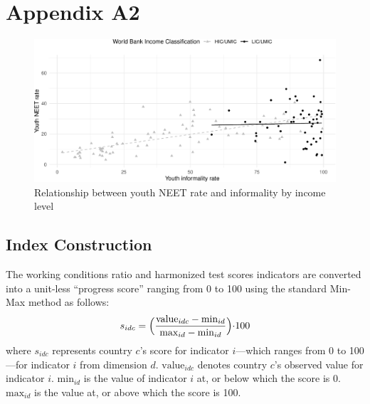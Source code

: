 \documentclass[
  a4paper, twoside, 12pt]{book}
\begin{document}
\newpage
{}
\printbibliography[segment=\therefsegment,heading=subbibintoc,title={References}]

\newpage

\hypertarget{appendix-a}{%
\section*{Appendix A2}\label{appendix-a}}


\setcounter{figure}{0}
\renewcommand{\thefigure}{A2.\arabic{figure}}
\setcounter{table}{0}
\renewcommand{\thetable}{A2.\arabic{table}}

\begin{figure}[H]
\includegraphics{figures/fig-infneet-1} \caption{Relationship between youth NEET rate and informality by income level}\label{fig:fig-infneet}
\end{figure}

\hypertarget{weights}{%
\subsection*{Index Construction}\label{weights}}


The working conditions ratio and harmonized test scores indicators are converted into a unit-less ``progress score'' ranging from 0 to 100 using the standard Min-Max method as follows:
\[ s_{idc}= \Bigl(\frac{\text{value}_{idc}- \text{min}_{id}}{ \text{max}_{id} - \text{min}_{id}} \Bigl) \cdot 100 \]
\vspace*{5pt}
where \(s_{idc}\) represents country \(c\)'s score for indicator \(i\)---which ranges from 0 to 100---for indicator \(i\) from dimension \(d\). \(\text{value}_{idc}\) denotes country \(c\)'s observed value for indicator \(i\). \(\text{min}_{id}\) is the value of indicator \(i\) at, or below which the score is 0. \(\text{max}_{id}\) is the value at, or above which the score is 100.
\end{document}
